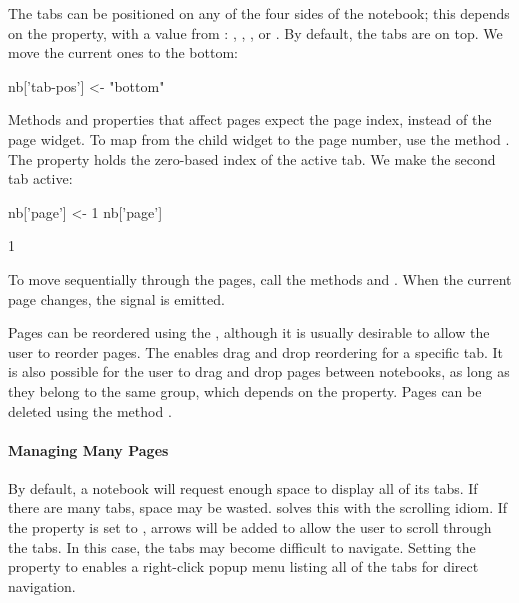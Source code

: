 The tabs can be positioned on any of the four sides of the notebook;
this depends on the  property, with a value from
: , , , or
. By default, the tabs are on top. We move the current ones to the
bottom:
\begin{Schunk}
\begin{Sinput}
 nb['tab-pos'] <- "bottom"
\end{Sinput}
\end{Schunk}

Methods and properties that affect pages expect the page index,
instead of the page widget. To map from the child widget to the page
number, use the method .  The
 property holds the zero-based index of the active
tab. We make the second tab active:
\begin{Schunk}
\begin{Sinput}
 nb['page'] <- 1
 nb['page']
\end{Sinput}
\begin{Soutput}
[1] 1
\end{Soutput}
\end{Schunk}
%
To move sequentially through the pages, call the methods
 and
. When the current page changes, the
 signal is emitted.

Pages can be reordered using the ,
although it is usually desirable to allow the user to reorder
pages. The  enables drag and
drop reordering for a specific tab. It is also possible for the user
to drag and drop pages between notebooks, as long as they belong to
the same group, which depends on the 
property. Pages can be deleted using the method
.

\paragraph{Managing Many Pages}

By default, a notebook will request enough space to display all of its
tabs. If there are many tabs, space may be wasted. 
solves this with the scrolling idiom. If the
property  is set to , arrows will be added
to allow the user to scroll through the tabs. In this case, the tabs
may become difficult to navigate. Setting the 
property to  enables a right-click popup menu listing all
of the tabs for direct navigation.

